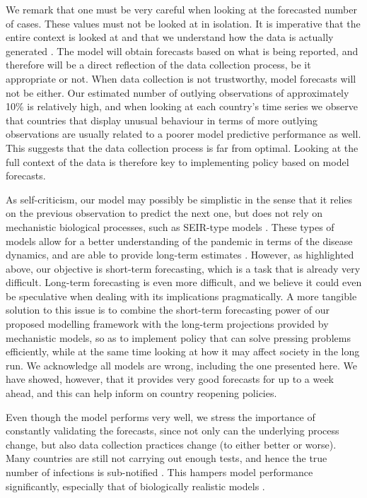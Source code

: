 \documentclass[fleqn,10pt]{wlscirep}
\begin{document}
We remark that one must be very careful when looking at the forecasted number of cases. These values must not be looked at in isolation. It is imperative that the entire context is looked at and that we understand how the data is actually generated \cite{Vespignani2020}. The model will obtain forecasts based on what is being reported, and therefore will be a direct reflection of the data collection process, be it appropriate or not. When data collection is not trustworthy, model forecasts will not be either. Our estimated number of outlying observations of approximately 10\% is relatively high, and when looking at each country's time series we observe that countries that display unusual behaviour in terms of more outlying observations are usually related to a poorer model predictive performance as well. This suggests that the data collection process is far from optimal. Looking at the full context of the data is therefore key to implementing policy based on model forecasts.

As self-criticism, our model may possibly be simplistic in the sense that it relies on the previous observation to predict the next one, but does not rely on mechanistic biological processes, such as SEIR-type models \cite{Satsuma2004, DeLaSen2015, Baker2018}. These types of models allow for a better understanding of the pandemic in terms of the disease dynamics, and are able to provide long-term estimates \cite{Giordano2020}. However, as highlighted above, our objective is short-term forecasting, which is a task that is already very difficult. Long-term forecasting is even more difficult, and we believe it could even be speculative when dealing with its implications pragmatically. A more tangible solution to this issue is to combine the short-term forecasting power of our proposed modelling framework with the long-term projections provided by mechanistic models, so as to implement policy that can solve pressing problems efficiently, while at the same time looking at how it may affect society in the long run. We acknowledge all models are wrong, including the one presented here. We have showed, however, that it provides very good forecasts for up to a week ahead, and this can help inform on country reopening policies.

Even though the model performs very well, we stress the importance of constantly validating the forecasts, since not only can the underlying process change, but also data collection practices change (to either better or worse). Many countries are still not carrying out enough tests, and hence the true number of infections is sub-notified \cite{Li2020}. This hampers model performance significantly, especially that of biologically realistic models \cite{Baker2018}.
\end{document}
